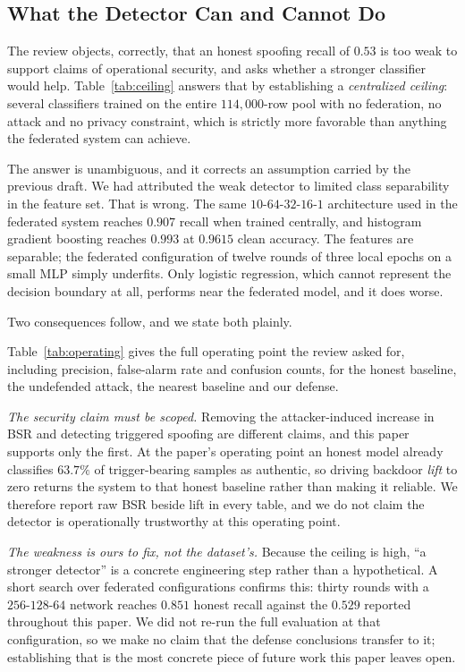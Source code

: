 \documentclass[journal]{IEEEtran}
\begin{document}
\subsection{What the Detector Can and Cannot Do}
\label{subsec:ceiling}
The review objects, correctly, that an honest spoofing recall of $0.53$ is too weak to support
claims of operational security, and asks whether a stronger classifier would help. Table~\ref{tab:ceiling}
answers that by establishing a \emph{centralized ceiling}: several classifiers trained on the entire
$114{,}000$-row pool with no federation, no attack and no privacy constraint, which is strictly more
favorable than anything the federated system can achieve.

The answer is unambiguous, and it corrects an assumption carried by the previous draft. We had
attributed the weak detector to limited class separability in the feature set. That is wrong. The
same $10\text{-}64\text{-}32\text{-}16\text{-}1$ architecture used in the federated system reaches
$0.907$ recall when trained centrally, and histogram gradient boosting reaches $0.993$ at
$0.9615$ clean accuracy. The features are separable; the federated configuration of twelve rounds
of three local epochs on a small MLP simply underfits. Only logistic regression, which cannot
represent the decision boundary at all, performs near the federated model, and it does worse.

Two consequences follow, and we state both plainly.

Table~\ref{tab:operating} gives the full operating point the review asked for, including precision, false-alarm rate and confusion counts, for the honest baseline, the undefended attack, the nearest baseline and our defense.

\textit{The security claim must be scoped.} Removing the attacker-induced increase in BSR and
detecting triggered spoofing are different claims, and this paper supports only the first. At the
paper's operating point an honest model already classifies $63.7\%$ of trigger-bearing samples as
authentic, so driving backdoor \emph{lift} to zero returns the system to that honest baseline rather
than making it reliable. We therefore report raw BSR beside lift in every table, and we do not claim
the detector is operationally trustworthy at this operating point.

\textit{The weakness is ours to fix, not the dataset's.} Because the ceiling is high, ``a stronger
detector'' is a concrete engineering step rather than a hypothetical. A short search over federated
configurations confirms this: thirty rounds with a $256\text{-}128\text{-}64$ network reaches
$0.851$ honest recall against the $0.529$ reported throughout this paper. We did not re-run the
full evaluation at that configuration, so we make no claim that the defense conclusions transfer to
it; establishing that is the most concrete piece of future work this paper leaves open.
\end{document}
